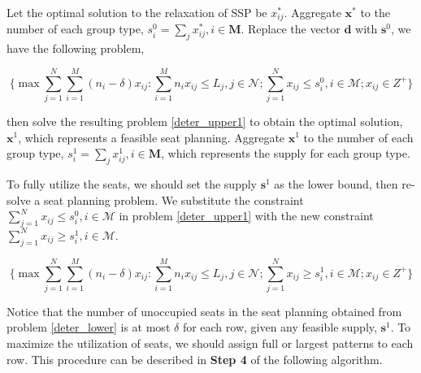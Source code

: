 
Let the optimal solution to the relaxation of SSP be $x^{*}_{ij}$. Aggregate $\mathbf{x}^{*}$ to the number of each group type, ${s}_{i}^{0} =\sum_{j} x^{*}_{ij}, i \in \mathbf{M}$. Replace the vector $\mathbf{d}$ with $\mathbf{s}^{0}$, we have the following problem, 

\begin{equation}\label{deter_upper1}
  \{\max \sum_{j=1}^{N} \sum_{i=1}^{M}(n_i -\delta) x_{ij}: \sum_{i = 1}^{M} n_i x_{ij} \leq L_{j}, j \in \mathcal{N}; \sum_{j =1}^{N} x_{ij} \leq s_{i}^{0}, i \in \mathcal{M}; x_{ij} \in Z^{+} \}
\end{equation}

then solve the resulting problem \eqref{deter_upper1} to obtain the optimal solution, $\mathbf{x}^{1}$, which represents a feasible seat planning. Aggregate $\mathbf{x}^{1}$ to the number of each group type, ${s}_{i}^{1} = \sum_{j} x^{1}_{ij}, i \in \mathbf{M}$, which represents the supply for each group type.

To fully utilize the seats, we should set the supply $\mathbf{s}^{1}$ as the lower bound, then re-solve a seat planning problem. We substitute the constraint $\sum_{j =1}^{N} x_{ij} \leq s_{i}^{0}, i \in \mathcal{M}$ in problem \eqref{deter_upper1} with the new constraint $\sum_{j =1}^{N} x_{ij} \geq s_{i}^{1}, i \in \mathcal{M}$.

\begin{equation}\label{deter_lower}
\{\max \sum_{j=1}^{N} \sum_{i=1}^{M}(n_i -\delta) x_{ij}: \sum_{i = 1}^{M} n_i x_{ij} \leq L_{j}, j \in \mathcal{N}; \sum_{j =1}^{N} x_{ij} \geq s_{i}^{1}, i \in \mathcal{M}; x_{ij} \in Z^{+} \}
\end{equation}

Notice that the number of unoccupied seats in the seat planning obtained from problem \eqref{deter_lower} is at most $\delta$ for each row, given any feasible supply, $\mathbf{s}^{1}$.
To maximize the utilization of seats, we should assign full or largest patterns to each row. This procedure can be described in {\bf Step 4} of the following algorithm.


